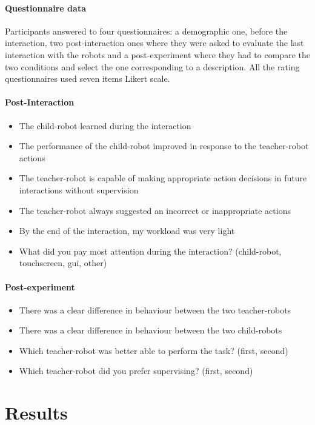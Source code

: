 \paragraph{Questionnaire data}
 
Participants answered to four questionnaires: a demographic one, before the interaction, two post-interaction ones where they were asked to evaluate the last interaction with the robots and a post-experiment where they had to compare the two conditions and select the one corresponding to a description. All the rating questionnaires used seven items Likert scale.

\paragraph{Post-Interaction}
\begin{itemize}
	\item The child-robot learned during the interaction
	\item The performance of the child-robot improved in response to the teacher-robot actions
	\item The teacher-robot is capable of making appropriate action decisions in future interactions without supervision
	\item The teacher-robot always suggested an incorrect or inappropriate actions
	\item By the end of the interaction, my workload was very light
	\item What did you pay most attention during the interaction? (child-robot, touchscreen, \gls{gui}, other)
\end{itemize}

\paragraph{Post-experiment}
\begin{itemize}
	\item There was a clear difference in behaviour between the two teacher-robots
	\item There was a clear difference in behaviour between the two child-robots
	\item Which teacher-robot was better able to perform the task? (first, second)
	\item Which teacher-robot did you prefer supervising? (first, second)
\end{itemize}

\section{Results}

